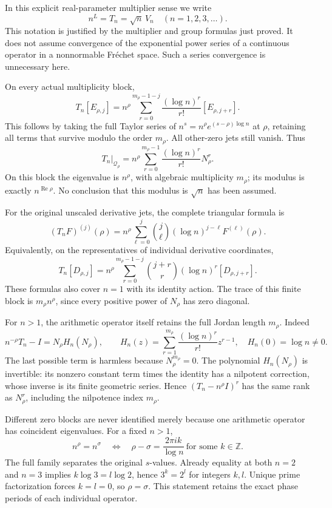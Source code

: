 \documentclass[
]{article}
\begin{document}
In this explicit real-parameter multiplier sense we write \[
\boxed{n^L=T_n=\sqrt n\,V_n\quad(n=1,2,3,\ldots).}
\tag{RZ8.6}
\] This notation is justified by the multiplier and group formulas just
proved. It does not assume convergence of the exponential power series
of a continuous operator in a nonnormable Fréchet space. Such a series
convergence is unnecessary here.

On every actual multiplicity block, \[
T_n[E_{\rho,j}]
=n^\rho\sum_{r=0}^{m_\rho-1-j}
\frac{(\log n)^r}{r!}[E_{\rho,j+r}].
\tag{RZ8.7}
\] This follows by taking the full Taylor series of
\(n^s=n^\rho e^{(s-\rho)\log n}\) at \(\rho\), retaining all terms that
survive modulo the order \(m_\rho\). All other-zero jets still vanish.
Thus \[
T_n|_{\mathcal Q_\rho}
=n^\rho\sum_{r=0}^{m_\rho-1}
\frac{(\log n)^r}{r!}N_\rho^r .
\tag{RZ8.8}
\] On this block the eigenvalue is \(n^\rho\), with algebraic
multiplicity \(m_\rho\); its modulus is exactly
\(n^{\operatorname{Re}\rho}\). No conclusion that this modulus is
\(\sqrt n\) has been assumed.

For the original unscaled derivative jets, the complete triangular
formula is \[
(T_nF)^{(j)}(\rho)
=n^\rho\sum_{\ell=0}^j
\binom j\ell(\log n)^{j-\ell}F^{(\ell)}(\rho).
\tag{RZ8.9}
\] Equivalently, on the representatives of individual derivative
coordinates, \[
T_n[D_{\rho,j}]
=n^\rho\sum_{r=0}^{m_\rho-1-j}
\binom{j+r}{r}(\log n)^r[D_{\rho,j+r}].
\tag{RZ8.10}
\] These formulas also cover \(n=1\) with its identity action. The trace
of this finite block is \(m_\rho n^\rho\), since every positive power of
\(N_\rho\) has zero diagonal.

For \(n>1\), the arithmetic operator itself retains the full Jordan
length \(m_\rho\). Indeed \[
n^{-\rho}T_n-I=N_\rho H_n(N_\rho),\qquad
H_n(z)=\sum_{r=1}^{m_\rho}\frac{(\log n)^r}{r!}z^{r-1},
\quad H_n(0)=\log n\ne0.
\tag{RZ8.11}
\] The last possible term is harmless because \(N_\rho^{m_\rho}=0\). The
polynomial \(H_n(N_\rho)\) is invertible: its nonzero constant term
times the identity has a nilpotent correction, whose inverse is its
finite geometric series. Hence \((T_n-n^\rho I)^r\) has the same rank as
\(N_\rho^r\), including the nilpotence index \(m_\rho\).

Different zero blocks are never identified merely because one arithmetic
operator has coincident eigenvalues. For a fixed \(n>1\), \[
n^\rho=n^\sigma
\quad\Longleftrightarrow\quad
\rho-\sigma=\frac{2\pi i k}{\log n}
\ \text{for some }k\in\mathbb Z.
\tag{RZ8.12}
\] The full family separates the original \(s\)-values. Already equality
at both \(n=2\) and \(n=3\) implies \(k\log3=l\log2\), hence \(3^k=2^l\)
for integers \(k,l\). Unique prime factorization forces \(k=l=0\), so
\(\rho=\sigma\). This statement retains the exact phase periods of each
individual operator.
\end{document}
